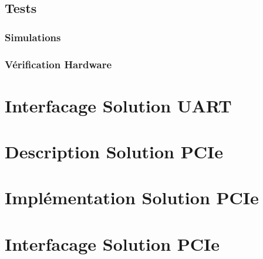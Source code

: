 \subsection{Tests}
\subsubsection{Simulations}
\subsubsection{Vérification Hardware}

\section{Interfacage Solution UART}

\newpage

\section{Description Solution PCIe}
\section{Implémentation Solution PCIe}
\section{Interfacage Solution PCIe}
